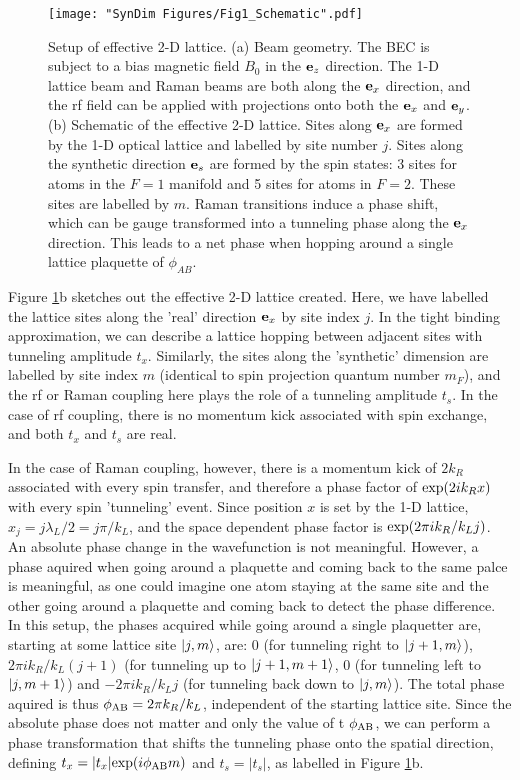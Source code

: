 \begin{figure}
	\texttt{[image: "SynDim Figures/Fig1\_Schematic".pdf]}
\caption[Setup of effective 2-D lattice]{Setup of effective 2-D lattice. (a) Beam geometry. The BEC is subject to a bias magnetic field $B_0$ in the ${\bf e}_z$ direction. The 1-D lattice beam and Raman beams are both along the ${\bf e}_x$ direction, and the rf field can be applied with projections onto both the  ${\bf e}_x$ and  ${\bf e}_y$. (b) Schematic of the effective 2-D lattice. Sites along  ${\bf e}_x$ are formed by the 1-D optical lattice and labelled by site number $j$. Sites along the synthetic direction  ${\bf e}_s$ are formed by the spin states: 3 sites for atoms in the $F=1$ manifold and 5 sites for atoms in $F=2$. These sites are labelled by $m$. Raman transitions induce a phase shift, which can be gauge transformed into a tunneling phase along the  ${\bf e}_x$ direction. This leads to a net phase when hopping around a single lattice plaquette of $\phi_{AB}$.  }
\label{fig:synDimSchematic}
\end{figure}


Figure \ref{fig:synDimSchematic}b sketches out the effective 2-D lattice created. Here, we have labelled the lattice sites along the 'real' direction  ${\bf e}_x$ by site index $j$. In the tight binding approximation, we can describe a lattice hopping between adjacent sites with tunneling amplitude $t_x$. Similarly, the sites along the 'synthetic' dimension are labelled by site index $m$ (identical to spin projection quantum number $m_F$), and the rf or Raman coupling here plays the role of a tunneling amplitude $t_s$. In the case of rf coupling, there is no momentum kick associated with spin exchange, and both $t_x$ and $t_s$ are real. 

In the case of Raman coupling, however, there is a momentum kick of $2k_R$ associated with every spin transfer, and therefore a phase factor of ${\rm exp}(2i k_R x)$ with every spin 'tunneling' event. Since position $x$ is set by the 1-D lattice, $x_j = j \lambda_L/2 = j \pi/k_L$, and the space dependent phase factor is ${\rm exp}(2\pi i k_R/k_L j)$. An absolute phase change in the wavefunction is not meaningful. However, a phase aquired when going around a plaquette and coming back to the same palce is meaningful, as one could imagine one atom staying at the same site and the other going around a plaquette and coming back to detect the phase difference. In this setup, the phases acquired while going around a single plaquetter are, starting at some lattice site $\mathinner{|{j,m}\rangle}$, are: $0$ (for tunneling right to $\mathinner{|{j+1,m}\rangle}$), $2\pi i k_R/k_L (j+1)$ (for tunneling up to $\mathinner{|{j+1,m+1}\rangle}$, $0$ (for tunneling left to $\mathinner{|{j,m+1}\rangle}$) and $-2\pi i k_R/k_L j$ (for tunneling back down to $\mathinner{|{j,m}\rangle}$). The total phase aquired is thus $\phi_{\rm AB} = 2\pi k_R/k_L$, independent of the starting lattice site. Since the absolute phase does not matter and only the value of t $\phi_{\rm AB}$, we can perform a phase transformation that shifts the tunneling phase onto the spatial direction, defining $t_x = |t_x|{\rm exp}(i\phi_{\rm AB}m)$ and $t_s=|t_s|$, as labelled in Figure \ref{fig:synDimSchematic}b. 

